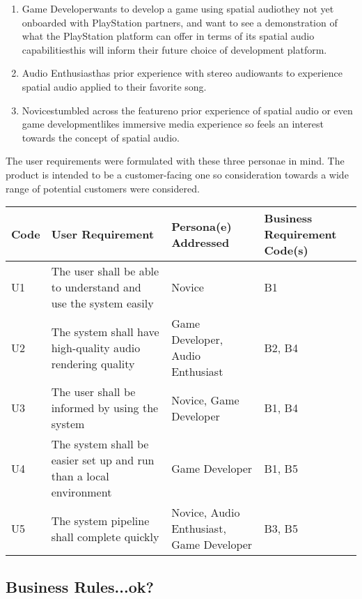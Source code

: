 \begin{enumerate}
    \item Game Developer\textemdash wants to develop a game using spatial audio\textemdash they not yet onboarded with PlayStation partners, and want to see a demonstration of what the PlayStation platform can offer in terms of its spatial audio capabilities\textemdash this will inform their future choice of development platform.
    \item Audio Enthusiast\textemdash has prior experience with stereo audio\textemdash wants to experience spatial audio applied to their favorite song.
    \item Novice\textemdash stumbled across the feature\textemdash no prior experience of spatial audio or even game development\textemdash likes immersive media experience so feels an interest towards the concept of spatial audio.
\end{enumerate}

The user requirements were formulated with these three personae in mind.
The product is intended to be a customer-facing one so consideration towards a wide range of potential customers were considered.

\begin{tabularx}{\textwidth}{szzs}
    \caption{User Requirements}\label{tab:user-requirements}\\
    \hline
    \textbf{Code} & \textbf{User Requirement} & \textbf{Persona(e) Addressed} & \textbf{Business Requirement Code(s)} \\\hline
    U1 & The user shall be able to understand and use the system easily & Novice & B1 \\\hline
    U2 & The system shall have high-quality audio rendering quality & Game Developer, Audio Enthusiast & B2, B4 \\\hline
    U3 & The user shall be informed by using the system & Novice, Game Developer & B1, B4 \\\hline
    U4 & The system shall be easier set up and run than a local environment & Game Developer & B1, B5 \\\hline
    U5 & The system pipeline shall complete quickly & Novice, Audio Enthusiast, Game Developer & B3, B5 \\\hline
\end{tabularx}

\subsection{Business Rules...ok?}\label{subsec:business-rules-ok}

